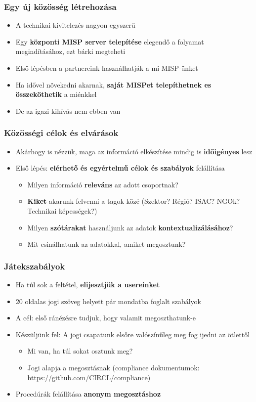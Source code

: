 \begin{frame}
  \frametitle{Egy új közösség létrehozása}
  \begin{itemize}
      \item A technikai kivitelezés nagyon egyszerű
      \item Egy {\bf központi MISP server telepítése} elegendő a folyamat megindításához, ezt bárki megteheti
      \item Első lépésben a partnereink használhatják a mi MISP-ünket
      \item Ha idővel növekedni akarnak, {\bf saját MISPet telepíthetnek es összeköthetik} a miénkkel
      \item De az igazi kihívás nem ebben van
  \end{itemize}
\end{frame}

\begin{frame}
  \frametitle{Közösségi célok és elvárások}
  \begin{itemize}
      \item Akárhogy is nézzük, maga az információ elkészítése mindig is {\bf időigényes} lesz
      \item Első lépés: {\bf elérhető és egyértelmű célok és szabályok} felállítása
      \begin{itemize}
          \item Milyen információ {\bf releváns} az adott csoportnak?
          \item {\bf Kiket} akarunk felvenni a tagok közé (Szektor? Régió? ISAC? NGOk? Technikai képességek?)
          \item Milyen {\bf szótárakat} használjunk az adatok {\bf kontextualizálásához}?
          \item Mit csinálhatunk az adatokkal, amiket megosztunk?
      \end{itemize}
  \end{itemize}
\end{frame}

\begin{frame}
  \frametitle{Játekszabályok}
  \begin{itemize}
      \item Ha túl sok a feltétel, {\bf elijesztjük a usereinket}
      \item 20 oldalas jogi szöveg helyett pár mondatba foglalt szabályok
      \item A cél: első ránézésre tudjuk, hogy valamit megoszthatunk-e
      \item Készüljünk fel: A jogi csapatunk elsőre valószínűleg meg fog ijedni az ötlettől
      \begin{itemize}
          \item Mi van, ha túl sokat osztunk meg?
          \item Jogi alapja a megosztásnak (compliance dokumentumok: https://github.com/CIRCL/compliance)
      \end{itemize}
      \item Procedúrák felállítása {\bf anonym megosztáshoz}
  \end{itemize}
\end{frame}


